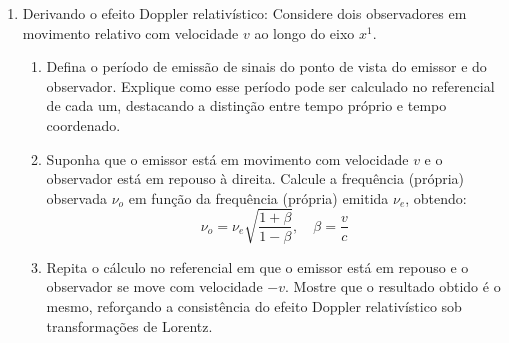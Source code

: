 \begin{enumerate}
\begin{enumerate}
                  \item A mudança de velocidade da nave implica uma descontinuidade nas
                        linhas de simultaneidade. Como descrever essa situação usando um
                        único sistema de coordenadas contínuo ao longo da trajetória da
                        nave?

                  \item Analise como a mudança instantânea de velocidade afeta o tempo
                        próprio acumulado pela nave. Como essa mudança pode ser
                        interpretada geometricamente no diagrama de espaço-tempo? E como
                        ela pode ser calculada?

                  \item Conceitualmente, por que não há simetria entre os dois gêmeos?
                        Qual elemento físico rompe a equivalência entre os referenciais?
                        Mostre como o uso de um único referencial inercial e o tempo
                        próprio ajuda a resolver o aparente paradoxo.
            \end{enumerate}

      \item Derivando o efeito Doppler relativístico: Considere dois observadores em
            movimento relativo com velocidade $v$ ao longo do eixo $x^1$.

            \begin{enumerate}
                  \item Defina o período de emissão de sinais do ponto de vista do
                        emissor e do observador. Explique como esse período pode ser calculado
                        no referencial de cada um, destacando a distinção entre tempo próprio
                        e tempo coordenado.

                  \item Suponha que o emissor está em movimento com velocidade $v$ e o
                        observador está em repouso à direita. Calcule a frequência
                        (própria) observada $\nu_o$ em função da frequência (própria)
                        emitida $\nu_e$, obtendo:
                        $$
                              \nu_o = \nu_e \sqrt{\frac{1 + \beta}{1 - \beta}}, \quad \beta = \frac{v}{c}
                        $$

                  \item Repita o cálculo no referencial em que o emissor está em repouso
                        e o observador se move com velocidade $-v$. Mostre que o resultado
                        obtido é o mesmo, reforçando a consistência do efeito Doppler
                        relativístico sob transformações de Lorentz.
            \end{enumerate}


\end{enumerate}
